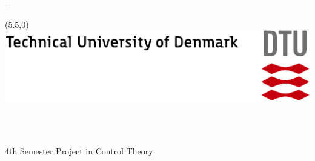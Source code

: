\begin{titlingpage}
 \thispagestyle{empty}
 \enlargethispage{1.3cm}
 \calccentering{\unitlength}
 \begin{adjustwidth}{\unitlength}{-\unitlength}
  \vspace*{-1.9cm}
  \begin{textblock}{6.5}(5.5,0) %
   \includegraphics[width=\textwidth]{resources/tex_dtu_uk_a1_cmyk}
  \end{textblock}
  \begin{raggedright}
   {\Huge\sffamily\ThAuthors\\[2cm]}
   \begin{Spacing}{1.2}
    {\sffamily\HUGE\textbf{\ThTitleEN}\\[1.5cm]}
    {\sffamily\LARGE{4th Semester Project in Control Theory}\\[2cm]}
   \end{Spacing}
 \end{raggedright}
  

\end{adjustwidth}
\end{titlingpage}
